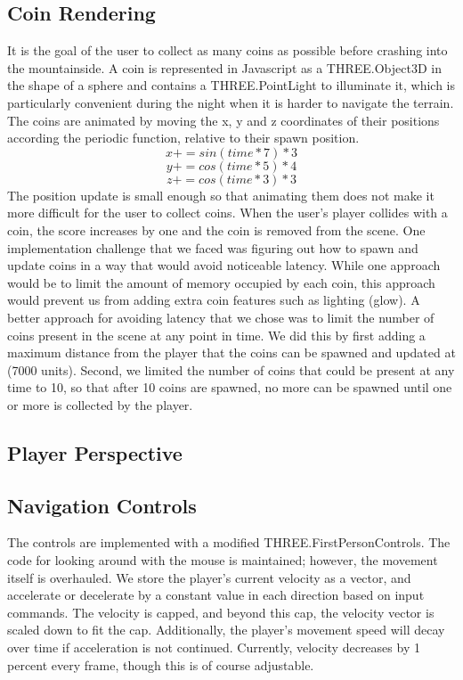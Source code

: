 \documentclass{article}
\begin{document}
\subsection{Coin Rendering}
It is the goal of the user to collect as many coins as possible before crashing into the mountainside.  A coin is represented in Javascript as a THREE.Object3D in the shape of a sphere and contains a THREE.PointLight to illuminate it, which is particularly convenient during the night when it is harder to navigate the terrain.  The coins are animated by moving the x, y and z coordinates of their positions according the periodic function, relative to their spawn position.
$$x += sin( time * 7 ) * 3$$
$$y += cos( time * 5 ) * 4$$
$$z += cos( time * 3 ) * 3$$
The position update is small enough so that animating them does not make it more difficult for the user to collect coins.  When the user's player collides with a coin, the score increases by one and the coin is removed from the scene.  One implementation challenge that we faced was figuring out how to spawn and update coins in a way that would avoid noticeable latency.  While one approach would be to limit the amount of memory occupied by each coin, this approach would prevent us from adding extra coin features such as lighting (glow).  A better approach for avoiding latency that we chose was to limit the number of coins present in the scene at any point in time.  We did this by first adding a maximum distance from the player that the coins can be spawned and updated at (7000 units).  Second, we limited the number of coins that could be present at any time to 10, so that after 10 coins are spawned, no more can be spawned until one or more is collected by the player.

\subsection{Player Perspective}
\subsection{Navigation Controls}
The controls are implemented with a modified THREE.FirstPersonControls. The code for looking around with the mouse is maintained; however, the movement itself is overhauled. We store the player's current velocity as a vector, and accelerate or decelerate by a constant value in each direction based on input commands. The velocity is capped, and beyond this cap, the velocity vector is scaled down to fit the cap. Additionally, the player's movement speed will decay over time if acceleration is not continued. Currently, velocity decreases by 1 percent every frame, though this is of course adjustable.
\end{document}
